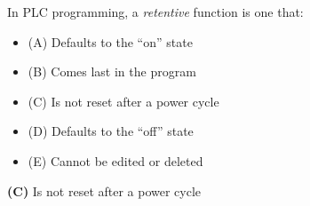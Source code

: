 

In PLC programming, a {\it retentive} function is one that:

\begin{itemize}
\item{(A)} Defaults to the ``on'' state
\vskip 5pt 
\item{(B)} Comes last in the program
\vskip 5pt 
\item{(C)} Is not reset after a power cycle
\vskip 5pt 
\item{(D)} Defaults to the ``off'' state
\vskip 5pt 
\item{(E)} Cannot be edited or deleted
\end{itemize}







{\bf (C)} Is not reset after a power cycle
 










